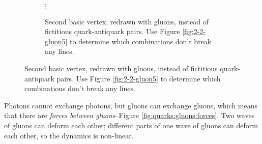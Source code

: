 \documentclass[]{article}
\begin{document}
\begin{figure}[H]
\begin{subfigure}[t]{0.40\textwidth}
	\end{subfigure}
	\hfill
	\begin{subfigure}[t]{0.45\textwidth}
		\caption{Second basic vertex, redrawn with gluons, instead of fictitious quark-antiquark pairs. Use Figure \ref{fig:2-2-gluon5} to determine which combinations don't break any lines.}\label{fig:2-2-gluon6}
		;
	\end{subfigure}
\end{figure}

Photons cannot exchange photons, but gluons can exchange gluons, which means that there are \emph{forces between gluons}--Figure \ref{fig:quarks:gluons:forces}. Two waves of gluons can deform each other; different parts of one wave of gluons can deform each other, so the dynamics is non-linear.
\end{document}
